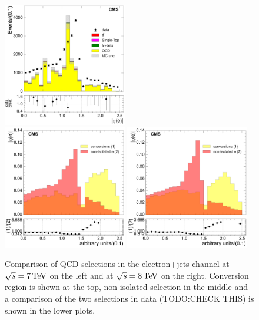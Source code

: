 \begin{figure}[hbtp]
      \includegraphics[width=0.48\textwidth]{Chapters/04_Analysis/04b_XSections/images/control_plots/before_fit/8TeV/qcd_plots/QCD_electron_AbsEta_non_iso_control_region_0btag_with_ratio}\\
      \includegraphics[width=0.48\textwidth]{Chapters/04_Analysis/04b_XSections/images/control_plots/before_fit/7TeV/qcd_plots/shape_comparisons/QCD_electron_AbsEta_control_region_comparison_0btag}\hfill
      \includegraphics[width=0.48\textwidth]{Chapters/04_Analysis/04b_XSections/images/control_plots/before_fit/8TeV/qcd_plots/shape_comparisons/QCD_electron_AbsEta_control_region_comparison_0btag}\\
     \caption{Comparison of QCD selections in the electron+jets channel at $\sqrt{s}=7\,\text{Te\hspace{-.08em}V}$ on the left
     and at $\sqrt{s}=8\,\text{Te\hspace{-.08em}V}$ on the right. Conversion region is shown at the top, non-isolated selection
     in the middle and a comparison of the two selections in data (TODO:CHECK THIS)
     is shown in the lower plots.}
     \label{fig:data_mc_comparison_electron_QCD}
\end{figure}

